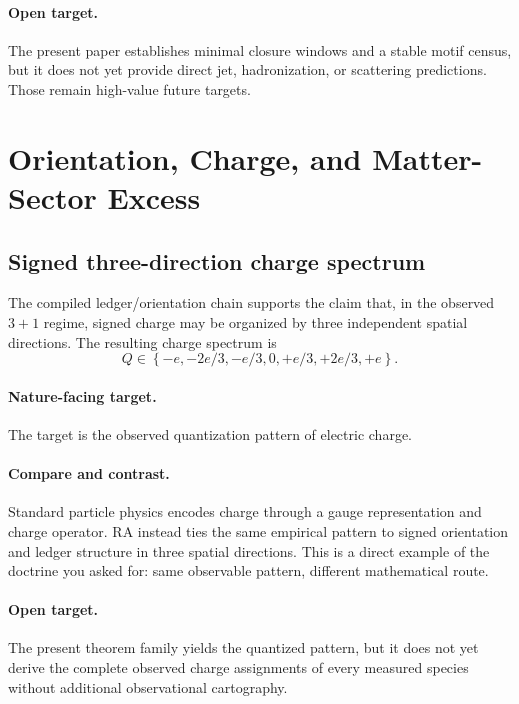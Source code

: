 \documentclass[11pt]{article}
\def\frac#1#2{#1/#2}%
\begin{document}
\paragraph{Open target.} The present paper establishes minimal closure windows and a stable motif census, but it does not yet provide direct jet, hadronization, or scattering predictions. Those remain high-value future targets.

\section{Orientation, Charge, and Matter-Sector Excess}

\subsection{Signed three-direction charge spectrum}

The compiled ledger/orientation chain supports the claim that, in the observed $3+1$ regime, signed charge may be organized by three independent spatial directions. The resulting charge spectrum is
\begin{equation}
Q \in \left\{-e,-\frac{2e}{3},-\frac{e}{3},0,+\frac{e}{3},+\frac{2e}{3},+e\right\}.
\end{equation}

\paragraph{Nature-facing target.} The target is the observed quantization pattern of electric charge.

\paragraph{Compare and contrast.} Standard particle physics encodes charge through a gauge representation and charge operator. RA instead ties the same empirical pattern to signed orientation and ledger structure in three spatial directions. This is a direct example of the doctrine you asked for: same observable pattern, different mathematical route.

\paragraph{Open target.} The present theorem family yields the quantized pattern, but it does not yet derive the complete observed charge assignments of every measured species without additional observational cartography.
\end{document}
